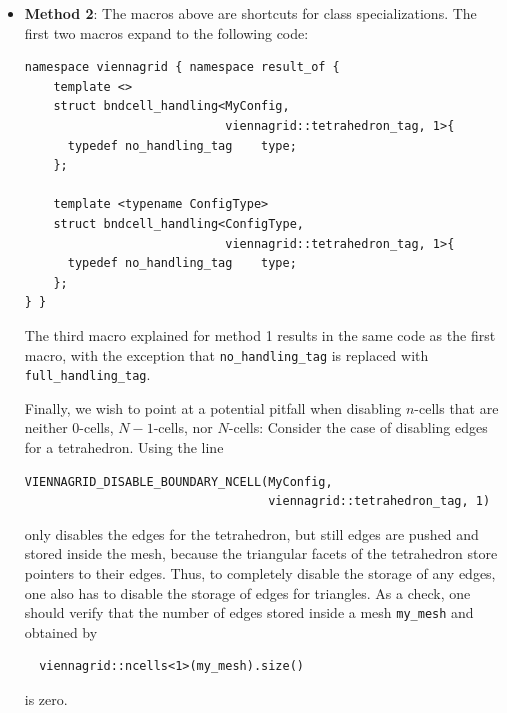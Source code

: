\begin{itemize}
 \item \textbf{Method 2}: The macros above are shortcuts for class specializations. The first two macros expand to the following code:
\begin{lstlisting}
namespace viennagrid { namespace result_of {
    template <>
    struct bndcell_handling<MyConfig,
                            viennagrid::tetrahedron_tag, 1>{
      typedef no_handling_tag    type;
    };

    template <typename ConfigType>
    struct bndcell_handling<ConfigType,
                            viennagrid::tetrahedron_tag, 1>{
      typedef no_handling_tag    type;
    };
} }
\end{lstlisting}
The third macro explained for method 1 results in the same code as the first macro, with the exception that \lstinline|no_handling_tag| is replaced with \lstinline|full_handling_tag|.

Finally, we wish to point at a potential pitfall when disabling $n$-cells that are neither $0$-cells, $N-1$-cells, nor $N$-cells: Consider the case of disabling edges for a tetrahedron. Using the line
  \begin{lstlisting}
VIENNAGRID_DISABLE_BOUNDARY_NCELL(MyConfig,
                                  viennagrid::tetrahedron_tag, 1)
  \end{lstlisting}
only disables the edges for the tetrahedron, but still edges are pushed and stored inside the mesh, because the triangular facets of the tetrahedron store pointers to their edges. Thus, to completely disable the storage of any edges, one also has to disable the storage of edges for triangles. As a check, one should verify that the number of edges stored inside a mesh \lstinline|my_mesh| and obtained by
 \begin{lstlisting}
  viennagrid::ncells<1>(my_mesh).size()
 \end{lstlisting}
is zero.



\end{itemize}
